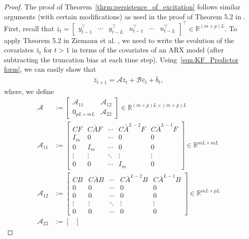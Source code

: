 \documentclass[11pt]{article}
\renewcommand{\cite}{\citep}
\newcommand{\Abar}{\bar{A}}
\newcommand{\zbar}{\bar{z}}
\newcommand{\bbar}{\bar{b}}
\newcommand{\Acal}{\mathcal{A}}
\newcommand{\Bcal}{\mathcal{B}}
\newcommand{\nn}{\nonumber}
\newcommand{\R}{\mathbb{R}}				%
\newcommand{\T}{\top}
\newcommand{\<}{\langle}
\renewcommand{\>}{\rangle}
\numberwithin{equation}{section}
\begin{document}
\begin{proof}
The proof of Theorem~\ref{thrm:persistence_of_excitation} follows similar arguments (with certain modifications) as used in the proof of Theorem 5.2 in \cite{ziemann2023tutorial}. First, recall that $\zbar_t = \begin{bmatrix} y_{t-1}^\T & \cdots & y_{t-L}^\T &  u_{t-1}^\T & \cdots & u_{t-L}^\T \end{bmatrix}^\T \in \R^{(m+p)L}$. To apply Theorem 5.2 in Ziemann et al. \cite{ziemann2023tutorial}, we need to write the evolution of the covariates $\zbar_t$ for $t >1$ in terms of the covariates of an ARX model (after subtracting the truncation bias at each time step). Using~\eqref{eqn:KF_Predictor form}, we can easily show that
\begin{align}
    \zbar_{t+1} = \Acal \zbar_t + \Bcal \bar v_t + \bbar_t, \label{eqn:zbar dynamics}
\end{align}
where, we define
\begin{align}
    \Acal &:= \begin{bmatrix}
        \Acal_{11} & \Acal_{12} \\
        0_{pL \times mL} & \Acal_{22}
    \end{bmatrix}
    \in \R^{(m+p)L \times (m+p)L} \nn \\
    \Acal_{11} &:= 
    \begin{bmatrix}
       C F & C \Abar F & \cdots & C \Abar^{L-2} F & C \Abar^{L-1} F \\
       I_m & 0 & \cdots & 0 & 0 \\
       0 & I_m & \cdots & 0 & 0 \\
       \vdots & \vdots & \ddots & \vdots & \vdots \\
       0 & 0 & \cdots & I_m & 0
    \end{bmatrix}
    \in \R^{mL \times mL} \nn \\
    \Acal_{12} &:= 
    \begin{bmatrix}
       C B & C \Abar B & \cdots & C \Abar^{L-2} B & C \Abar^{L-1} B \\
       0 & 0 & \cdots & 0 & 0 \\
       0 & 0 & \cdots & 0 & 0 \\
       \vdots & \vdots & \ddots & \vdots & \vdots \\
       0 & 0 & \cdots & 0 & 0
    \end{bmatrix}
     \in \R^{mL \times pL} \nn \\  %
     \Acal_{22} &:= 
    \begin{bmatrix}

\end{bmatrix}
\end{align}
\end{proof}
\end{document}
